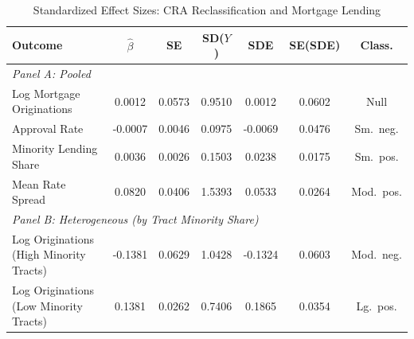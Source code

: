 \begin{table}[htbp]
\centering
\caption{Standardized Effect Sizes: CRA Reclassification and Mortgage Lending}
\label{tab:sde}
\begin{threeparttable}
\footnotesize
\begin{tabular}{@{}lcccccc@{}}
\toprule
Outcome & $\hat{\beta}$ & SE & SD($Y$) & SDE & SE(SDE) & Class. \\
\midrule
\multicolumn{7}{l}{\textit{Panel A: Pooled}} \\
Log Mortgage Originations & 0.0012 & 0.0573 & 0.9510 & 0.0012 & 0.0602 & Null \\
Approval Rate & -0.0007 & 0.0046 & 0.0975 & -0.0069 & 0.0476 & Sm.\ neg. \\
Minority Lending Share & 0.0036 & 0.0026 & 0.1503 & 0.0238 & 0.0175 & Sm.\ pos. \\
Mean Rate Spread & 0.0820 & 0.0406 & 1.5393 & 0.0533 & 0.0264 & Mod.\ pos. \\
\midrule
\multicolumn{7}{l}{\textit{Panel B: Heterogeneous (by Tract Minority Share)}} \\
Log Originations (High Minority Tracts) & -0.1381 & 0.0629 & 1.0428 & -0.1324 & 0.0603 & Mod.\ neg. \\
Log Originations (Low Minority Tracts) & 0.1381 & 0.0262 & 0.7406 & 0.1865 & 0.0354 & Lg.\ pos. \\
\bottomrule
\end{tabular}
\begin{tablenotes}[flushleft]
\footnotesize\raggedright

\end{tablenotes}
\end{threeparttable}
\end{table}
